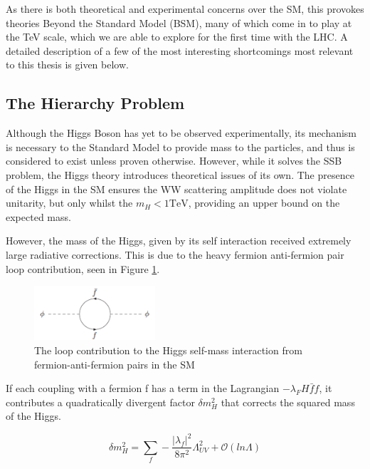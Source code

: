 As there is both theoretical and experimental concerns over the SM, this provokes theories Beyond the Standard Model (BSM), many of which come in to play at the TeV scale, which we are able to explore for the first time with the LHC. A detailed description of a few of the most interesting shortcomings most relevant to this thesis is given below.

\subsection{The Hierarchy Problem}
Although the Higgs Boson has yet to be observed experimentally, its mechanism is necessary to the Standard Model to provide mass to the particles, and thus is considered to exist unless proven otherwise. However, while it solves the SSB problem, the Higgs theory introduces theoretical issues of its own. The presence of the Higgs in the SM ensures the WW scattering amplitude does not violate unitarity, but only whilst the $m_{H} < 1 \textrm{TeV}$, providing an upper bound on the expected mass\cite{WWHMass}. 

However, the mass of the Higgs, given by its self interaction received extremely large radiative corrections. This is due to the heavy fermion anti-fermion pair loop contribution, seen in Figure \ref{fig:hiloop}. 

\begin{figure}
\centering
\includegraphics[width=0.4\textwidth]{Figures/Theory/higgsself}
\caption{\label{fig:hiloop}The loop contribution to the Higgs self-mass interaction from fermion-anti-fermion pairs in the SM}
\end{figure}

If each coupling with a fermion f has a term in the Lagrangian $-\lambda_{F} H \bar{f}f$, it contributes a quadratically divergent factor $\delta m^{2}_{H}$ that corrects the squared mass of the Higgs. 

\begin{equation}
\delta m^{2}_{H} =\sum_{f} - \frac{|\lambda_{f}|^{2}}{8 \pi^{2}}\Lambda^{2}_{UV} + \mathcal{O}(ln\Lambda)
\label{eqn:HIGGQUAD}
\end{equation}

